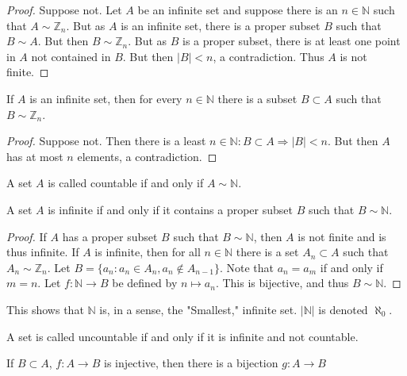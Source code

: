             \begin{proof}
            Suppose not. Let $A$ be an infinite set and suppose there is an $n\in \mathbb{N}$ such that $A\sim \mathbb{Z}_n$. But as $A$ is an infinite set, there is a proper subset $B$ such that $B\sim A$. But then $B\sim \mathbb{Z}_n$. But as $B$ is a proper subset, there is at least one point in $A$ not contained in $B$. But then $|B|<n$, a contradiction. Thus $A$ is not finite.
            \end{proof}
            \begin{corollary}
            If $A$ is an infinite set, then for every $n\in \mathbb{N}$ there is a subset $B\subset A$ such that $B\sim \mathbb{Z}_n$.
            \end{corollary}
            \begin{proof}
            Suppose not. Then there is a least $n\in \mathbb{N}:B\subset A\Rightarrow |B|<n$. But then $A$ has at most $n$ elements, a contradiction.
            \end{proof}
            \begin{definition}
            A set $A$ is called countable if and only if $A\sim \mathbb{N}$.
            \end{definition}
            \begin{theorem}
            A set $A$ is infinite if and only if it contains a proper subset $B$ such that $B\sim \mathbb{N}$.
            \end{theorem}
            \begin{proof}
            If $A$ has a proper subset $B$ such that $B\sim \mathbb{N}$, then $A$ is not finite and is thus infinite. If $A$ is infinite, then for all $n\in \mathbb{N}$ there is a set $A_n\subset A$ such that $A_n \sim \mathbb{Z}_n$. Let $B = \{a_n: a_n \in A_n, a_n \notin A_{n-1}\}$. Note that $a_{n} = a_{m}$ if and only if $m= n$. Let $f:\mathbb{N} \rightarrow B$ be defined by $n\mapsto a_n$. This is bijective, and thus $B\sim \mathbb{N}$.
            \end{proof}
            \begin{remark}
            This shows that $\mathbb{N}$ is, in a sense, the "Smallest," infinite set. $|\mathbb{N}|$ is denoted $\aleph_0$.
            \end{remark}
            \begin{definition}
            A set is called uncountable if and only if it is infinite and not countable.
            \end{definition}
            \begin{lemma}
            If $B\subset A$, $f:A\rightarrow B$ is injective, then there is a bijection $g:A\rightarrow B$
            \end{lemma}
